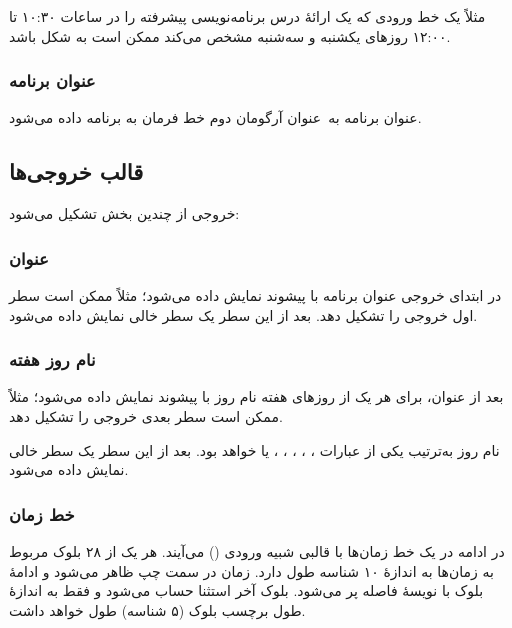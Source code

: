 \documentclass{utap}
\begin{document}
    مثلاً  یک خط ورودی که یک ارائهٔ درس برنامه‌نویسی پیشرفته را در ساعات ۱۰:۳۰ تا ۱۲:۰۰ روزهای یکشنبه و سه‌شنبه مشخص می‌کند ممکن است به شکل  باشد.

    \subsubsection{عنوان برنامه}

    عنوان برنامه به~عنوان آرگومان دوم خط فرمان به برنامه داده می‌شود.

    \subsection{قالب خروجی‌ها}

    خروجی از چندین بخش تشکیل می‌شود:

    \subsubsection{عنوان}

    در ابتدای خروجی عنوان برنامه با پیشوند \lr{\texttt{\# }} نمایش داده می‌شود؛ مثلاً  ممکن است  سطر اول خروجی را تشکیل دهد. بعد از این سطر یک سطر خالی نمایش داده می‌شود.

    \subsubsection{نام روز هفته}

    بعد از عنوان، برای هر یک از روزهای هفته نام روز با پیشوند \lr{\texttt{\#\# }} نمایش داده می‌شود؛ مثلاً  ممکن است  سطر بعدی خروجی را تشکیل دهد.

    نام روز به‌ترتیب یکی از عبارات ، ، ، ، ،  یا  خواهد بود. بعد از این سطر یک سطر خالی نمایش داده می‌شود.

    \subsubsection{خط زمان}

    در ادامه در یک خط زمان‌ها با قالبی شبیه ورودی () می‌آیند. هر یک از ۲۸ بلوک مربوط به زمان‌ها به اندازهٔ ۱۰ شناسه طول دارد. زمان در سمت چپ ظاهر می‌شود و ادامهٔ  بلوک با نویسهٔ فاصله پر می‌شود. بلوک آخر استثنا حساب می‌شود و فقط به اندازهٔ  طول برچسب بلوک (۵ شناسه) طول خواهد داشت.
\end{document}
